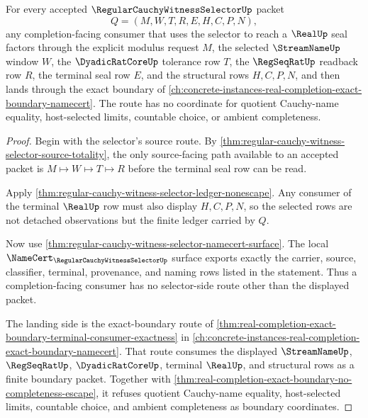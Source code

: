 \begin{theorem}
\label{thm:regular-cauchy-witness-selector-completion-boundary-route}
For every accepted $\RegularCauchyWitnessSelectorUp$ packet
$$
Q=(M,W,T,R,E,H,C,P,N),
$$
any completion-facing consumer that uses the selector to reach a $\RealUp$ seal factors through the explicit modulus request $M$, the selected $\StreamNameUp$ window $W$, the $\DyadicRatCoreUp$ tolerance row $T$, the $\RegSeqRatUp$ readback row $R$, the terminal seal row $E$, and the structural rows $H,C,P,N$, and then lands through the exact boundary of \autoref{ch:concrete-instances-real-completion-exact-boundary-namecert}. The route has no coordinate for quotient Cauchy-name equality, host-selected limits, countable choice, or ambient completeness.
\end{theorem}
\begin{proof}
Begin with the selector's source route. By \autoref{thm:regular-cauchy-witness-selector-source-totality}, the only source-facing path available to an accepted packet is $M \mapsto W \mapsto T \mapsto R$ before the terminal seal row can be read.

Apply \autoref{thm:regular-cauchy-witness-selector-ledger-nonescape}. Any consumer of the terminal $\RealUp$ row must also display $H,C,P,N$, so the selected rows are not detached observations but the finite ledger carried by $Q$.

Now use \autoref{thm:regular-cauchy-witness-selector-namecert-surface}. The local $\NameCert_{\RegularCauchyWitnessSelectorUp}$ surface exports exactly the carrier, source, classifier, terminal, provenance, and naming rows listed in the statement. Thus a completion-facing consumer has no selector-side route other than the displayed packet.

The landing side is the exact-boundary route of \autoref{thm:real-completion-exact-boundary-terminal-consumer-exactness} in \autoref{ch:concrete-instances-real-completion-exact-boundary-namecert}. That route consumes the displayed $\StreamNameUp$, $\RegSeqRatUp$, $\DyadicRatCoreUp$, terminal $\RealUp$, and structural rows as a finite boundary packet. Together with \autoref{thm:real-completion-exact-boundary-no-completeness-escape}, it refuses quotient Cauchy-name equality, host-selected limits, countable choice, and ambient completeness as boundary coordinates.
\end{proof}



